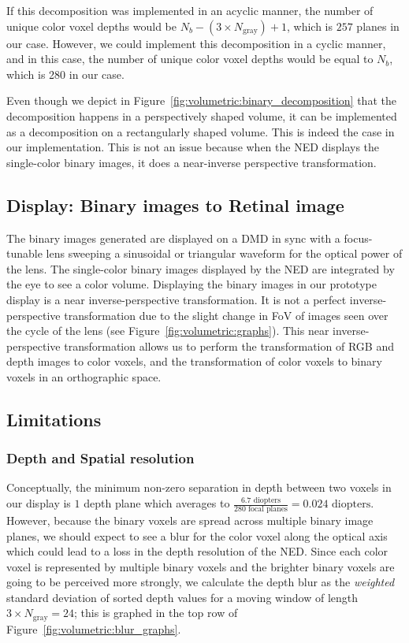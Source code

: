 If this decomposition was implemented in an acyclic manner, the number of unique color voxel depths would be $N_b - (3 \times N_{\text{gray}}) + 1$, which is $257$ planes in our case. However, we could implement this decomposition in a cyclic manner, and in this case, the number of unique color voxel depths would be equal to $N_b$, which is 280 in our case. 

Even though we depict in Figure~\ref{fig:volumetric:binary_decomposition} that the decomposition happens in a perspectively shaped volume, it can be implemented as a decomposition on a rectangularly shaped volume. This is indeed the case in our implementation. This is not an issue because when the NED displays the single-color binary images, it does a near-inverse perspective transformation. 

\subsection{Display: Binary images to Retinal image}
The binary images generated are displayed on a DMD in sync with a focus-tunable lens sweeping a sinusoidal or triangular waveform for the optical power of the lens. The single-color binary images displayed by the NED are integrated by the eye to see a color volume. Displaying the binary images in our prototype display is a near inverse-perspective transformation. It is not a perfect inverse-perspective transformation due to the slight change in FoV of images seen over the cycle of the lens (see Figure~\ref{fig:volumetric:graphs}). This near inverse-perspective transformation allows us to perform the transformation of RGB and depth images to color voxels, and the transformation of color voxels to binary voxels in an orthographic space. 

\subsection{Limitations}
\subsubsection{Depth and Spatial resolution}

Conceptually, the minimum non-zero separation in depth between two voxels in our display is $1$ depth plane which averages to $\frac{\text{6.7 diopters}}{\text{280 focal planes}}=\text{0.024 diopters}$. However, because the binary voxels are spread across multiple binary image planes, we should expect to see a blur for the color voxel along the optical axis which could lead to a loss in the depth resolution of the NED. Since each color voxel is represented by multiple binary voxels and the brighter binary voxels are going to be perceived more strongly, we calculate the depth blur as the \emph{weighted} standard deviation of sorted depth values for a moving window of length $3 \times N_{\text{gray}}=24$; this is graphed in the top row of Figure~\ref{fig:volumetric:blur_graphs}. 

